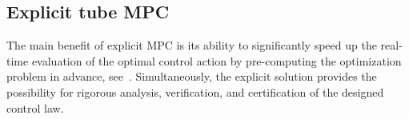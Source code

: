 \documentclass[letterpaper, 10 pt, conference]{ieeeconf}
\begin{document}
	
	\subsection{Explicit tube MPC}
	\label{sec:explicit_mpc}
	
	The main benefit of explicit MPC is its ability to significantly speed up the real-time evaluation of the optimal control action by pre-computing the optimization problem in advance, see~\cite{BM02}. Simultaneously, the explicit solution provides the possibility for rigorous analysis, verification, and certification of the designed control law. 
	
\end{document}

